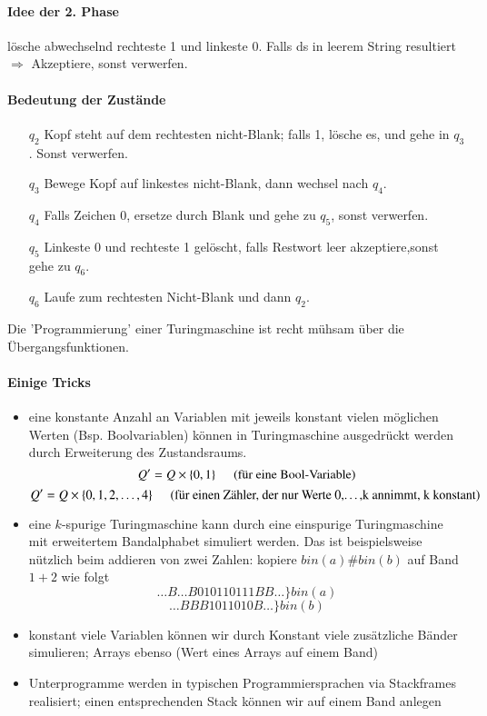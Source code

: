 \paragraph*{Idee der 2. Phase} lösche abwechselnd rechteste 1 und linkeste 0. Falls ds in leerem String resultiert $\Rightarrow$ Akzeptiere, sonst verwerfen.

\paragraph*{Bedeutung der Zustände}
\begin{itemize}
	\item[$q_2$] Kopf steht auf dem rechtesten nicht-Blank; falls 1, lösche es, und gehe in $q_3$. Sonst verwerfen.
	\item[$q_3$] Bewege Kopf auf linkestes nicht-Blank, dann wechsel nach $q_4$.
	\item[$q_4$] Falls Zeichen 0, ersetze durch Blank und gehe zu $q_5$, sonst verwerfen.
	\item[$q_5$] Linkeste 0 und rechteste 1 gelöscht, falls Restwort leer akzeptiere,sonst gehe zu $q_6$.
	\item[$q_6$] Laufe zum rechtesten Nicht-Blank und dann $q_2$.
\end{itemize}

\par\medskip Die 'Programmierung' einer Turingmaschine ist recht mühsam über die Übergangsfunktionen.

\paragraph*{Einige Tricks}
\begin{itemize}
	\item eine konstante Anzahl an Variablen mit jeweils konstant vielen möglichen Werten (Bsp. Boolvariablen) können in Turingmaschine ausgedrückt werden durch Erweiterung des Zustandsraums. $$ Q'=Q \times \{0,1\} \hspace{0.5cm}\text{(für eine Bool-Variable)}$$ $$ Q'=Q \times \{ 0,1,2,\dots,4 \} \hspace{0.5cm}\text{(für einen Zähler, der nur Werte 0,\dots,k annimmt, k konstant)} $$
	\item eine $k$-spurige Turingmaschine kann durch eine einspurige Turingmaschine mit erweitertem Bandalphabet simuliert werden. Das ist beispielsweise nützlich beim addieren von zwei Zahlen: kopiere $bin(a)\#bin(b)$ auf Band $1+2$ wie folgt $$ \dots B \dots B010110111BB \dots \} bin(a) $$ $$ \dots BBB1011010B \dots \} bin(b) $$
	\item konstant viele Variablen können wir durch Konstant viele zusätzliche Bänder simulieren; Arrays ebenso (Wert eines Arrays auf einem Band)
	\item Unterprogramme werden in typischen Programmiersprachen via Stackframes realisiert; einen entsprechenden Stack können wir auf einem Band anlegen
\end{itemize}